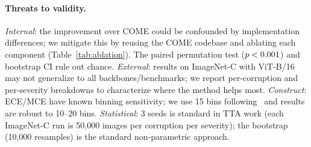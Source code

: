 \paragraph{Threats to validity.}
\emph{Internal}: the improvement over COME could be confounded by implementation differences; we mitigate this by reusing the COME codebase and ablating each component (Table~\ref{tab:ablation}). The paired permutation test ($p < 0.001$) and bootstrap CI rule out chance. \emph{External}: results on ImageNet-C with ViT-B/16 may not generalize to all backbones/benchmarks; we report per-corruption and per-severity breakdowns to characterize where the method helps most. \emph{Construct}: ECE/MCE have known binning sensitivity; we use 15 bins following~\citet{guo2017calibration} and results are robust to 10--20 bins. \emph{Statistical}: 3 seeds is standard in TTA work (each ImageNet-C run is 50{,}000 images per corruption per severity); the bootstrap (10{,}000 resamples) is the standard non-parametric approach.
